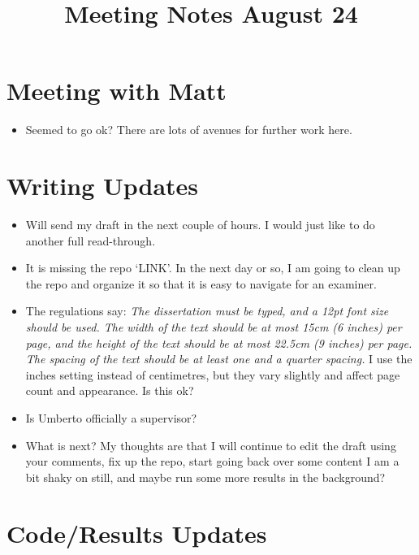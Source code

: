 \documentclass[12pt,a4paper]{article}
\title{Meeting Notes August 24}
\author{}
\date{}
\begin{document}
\maketitle


\section{Meeting with Matt}
\begin{itemize}
    \item Seemed to go ok? There are lots of avenues for further work here. 
\end{itemize}




\section{Writing Updates}


\begin{itemize}
    \item Will send my draft in the next couple of hours. I would just like to do another full read-through. 
    \item It is missing the repo `LINK'. In the next day or so, I am going to clean up the repo and organize it so that it is easy to navigate for an examiner. 
    \item The regulations say:\textit{ The dissertation must be typed, and a 12pt font size should be used. The width of the text should be at most 15cm (6 inches) per page, and the height of the text should be at most 22.5cm (9 inches) per page. The spacing of the text should be at least one and a quarter spacing.} I use the inches setting instead of centimetres, but they vary slightly and affect page count and appearance. Is this ok?
    \item Is Umberto officially a supervisor? 
    \item What is next? My thoughts are that I will continue to edit the draft using your comments, fix up the repo, start going back over some content I am a bit shaky on still, and maybe run some more results in the background?
\end{itemize}

\newpage 
\section{Code/Results Updates}
\end{document}
